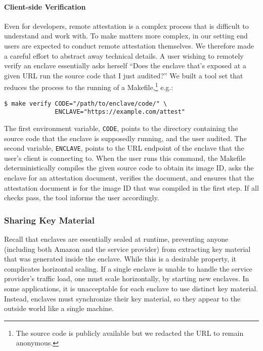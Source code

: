 \paragraph{Client-side Verification}

Even for developers, remote attestation is a complex process that is difficult
to understand and work with.  To make matters more complex, in our setting end
users are expected to conduct remote attestation themselves.  We therefore made
a careful effort to abstract away technical details.  A user wishing to remotely
verify an enclave essentially asks herself ``Does the enclave that's exposed at
a given URL run the source code that I just audited?''  We built a tool set that
reduces the process to the running of a Makefile,\footnote{The source code is
publicly available but we redacted the URL to remain anonymous.} e.g.:

\begin{lstlisting}[numbers=none]
$ make verify CODE="/path/to/enclave/code/" \
              ENCLAVE="https://example.com/attest"
\end{lstlisting}

The first environment variable, \texttt{CODE}, points to the directory
containing the source code that the enclave is supposedly running, and the user
audited.  The second variable, \texttt{ENCLAVE}, points to the URL endpoint of
the enclave that the user's client is connecting to.  When the user runs this
command, the Makefile deterministically compiles the given source code to
obtain its image ID, asks the enclave for an attestation document, verifies the
document, and ensures that the attestation document is for the image ID that
was compiled in the first step.  If all checks pass, the tool informs the user
accordingly.

\subsubsection{Sharing Key Material}
\label{sec:sync}

Recall that enclaves are essentially sealed at runtime, preventing
anyone (including both Amazon and the service provider) from extracting key material that was generated
inside the enclave.  While this is a desirable property, it complicates
horizontal scaling.  If a single enclave is unable to handle the service
provider's traffic load, one must scale horizontally, by starting new enclaves.
In some applications, it is unacceptable for each enclave to use distinct key
material.  Instead, enclaves must synchronize their key material, so they
appear to the outside world like a single machine.

